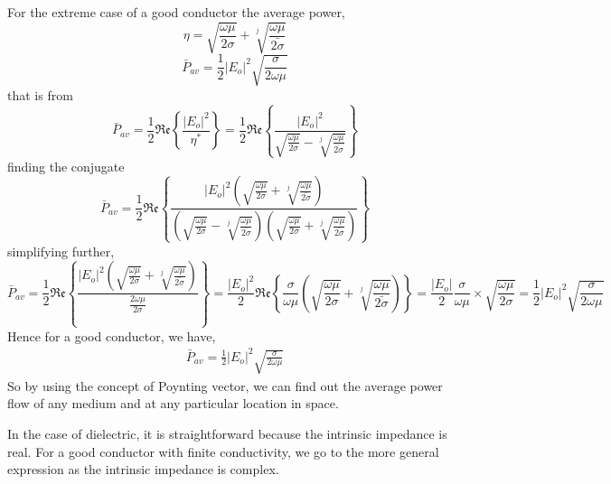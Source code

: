 For the extreme case of a good conductor the average power,
\begin{dmath*}
\eta=\sqrt{\frac{\omega\mu}{2\sigma}}+\sqrt[j]{\frac{\omega\mu}{\bar{2\sigma}}}
\end{dmath*}
\begin{dmath*}
\bar{P}_{av}=\frac{1}{2}|E_{o}|^{2}\sqrt{\frac{\sigma}{2\omega\mu}} 
\end{dmath*}
that is from
\begin{dmath*}
\bar{P}_{av}=\frac{1}{2}\mathfrak{Re}\left\{\frac{|E_{o}|^{2}}{\eta^{*}}\right\}=\frac{1}{2}\mathfrak{Re}\left\{\frac{|E_{o}|^{2}}{\sqrt{\frac{\omega\mu}{2\sigma}}-\sqrt[j]{\frac{\omega\mu}{\bar{2\sigma}}}}\right\}
\end{dmath*}
finding the conjugate
\begin{dmath*}
\bar{P}_{av}= \frac{1}{2}\mathfrak{Re}\left\{\frac{|E_{o}|^{2}\left(\sqrt{\frac{\omega\mu}{2\sigma}}+\sqrt[j]{\frac{\omega\mu}{\bar{2\sigma}}}\right)}{\left(\sqrt{\frac{\omega\mu}{2\sigma}}-\sqrt[j]{\frac{\omega\mu}{\bar{2\sigma}}}\right)\left(\sqrt{\frac{\omega\mu}{2\sigma}}+\sqrt[j]{\frac{\omega\mu}{\bar{2\sigma}}}\right)}\right\}
\end{dmath*}
simplifying further,
\begin{dmath*}
\bar{P}_{av}=\frac{1}{2}\mathfrak{Re}\left\{\frac{|E_{o}|^{2}(\sqrt{\frac{\omega\mu}{2\sigma}}+\sqrt[j]{\frac{\omega\mu}{\bar{2\sigma}}})}{\frac{2\omega\mu}{2\sigma}}\right\}
= \frac{|E_{o}|^{2}}{2}\mathfrak{Re}\left\{\frac{\sigma}{\omega\mu}\left(\sqrt{\frac{\omega\mu}{2\sigma}}+\sqrt[j]{\frac{\omega\mu}{\bar{2\sigma}}}\right) \right\}
 =\frac{|E_{o}|}{2}\frac{\sigma}{\omega\mu}\times\sqrt{\frac{\omega\mu}{2\sigma}}=\frac{1}{2}|E_{o}|^{2}\sqrt{\frac{\sigma}{2\omega\mu}} 
\end{dmath*}
Hence for a good conductor, we have, 
\begin{align}
\bar{P}_{av}=\frac{1}{2}|E_{o}|^{2}\sqrt{\frac{\sigma}{2\omega\mu}} 
\end{align}
So by using the concept of Poynting vector, we can find out the average power flow of any medium and at any particular location in space.

In the case of dielectric, it is straightforward because the intrinsic impedance is real. For a good conductor with finite conductivity, we go to the more general expression as the intrinsic impedance is complex.
